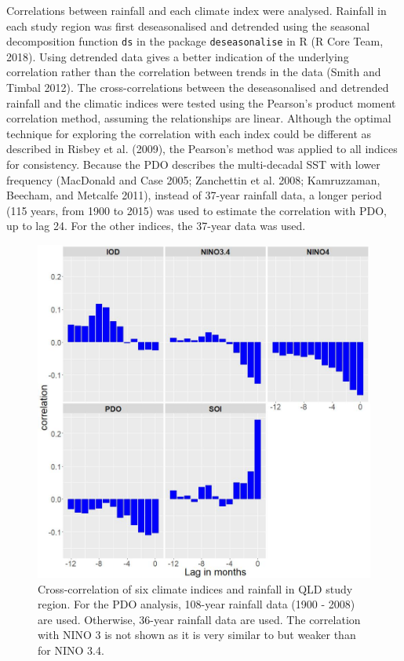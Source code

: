 \documentclass[]{elsarticle} %
\theoremstyle{definition}
\theoremstyle{definition}
\theoremstyle{definition}
\theoremstyle{remark}
\begin{document}
Correlations between rainfall and each climate index were analysed.
Rainfall in each study region was first deseasonalised and detrended
using the seasonal decomposition function \texttt{ds} in the package
\texttt{deseasonalise} in R (R Core Team, 2018). Using detrended data
gives a better indication of the underlying correlation rather than the
correlation between trends in the data (Smith and Timbal 2012). The
cross-correlations between the deseasonalised and detrended rainfall and
the climatic indices were tested using the Pearson's product moment
correlation method, assuming the relationships are linear. Although the
optimal technique for exploring the correlation with each index could be
different as described in Risbey et al. (2009), the Pearson's method was
applied to all indices for consistency. Because the PDO describes the
multi-decadal SST with lower frequency (MacDonald and Case 2005;
Zanchettin et al. 2008; Kamruzzaman, Beecham, and Metcalfe 2011),
instead of 37-year rainfall data, a longer period (115 years, from 1900
to 2015) was used to estimate the correlation with PDO, up to lag 24.
For the other indices, the 37-year data was used.

\begin{figure}
\includegraphics[width=0.9\linewidth]{figures/cor_qld} \caption{Cross-correlation of six climate indices and rainfall in QLD study region. For the PDO analysis, 108-year rainfall data (1900 - 2008) are used. Otherwise, 36-year rainfall data are used. The correlation with NINO 3 is not shown as it is very similar to but weaker than for NINO 3.4.}\label{fig:cor-rain-qld}
\end{figure}
\end{document}
